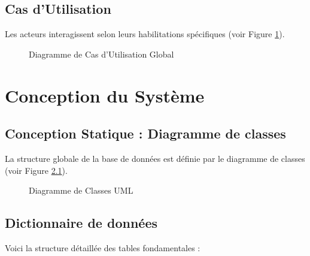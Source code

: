 \documentclass[12pt,a4paper,oneside]{report}
\begin{document}
\section{Cas d'Utilisation}
Les acteurs interagissent selon leurs habilitations spécifiques (voir Figure \ref{fig:usecase}).

\begin{figure}[H]
    \centering
    \color{gray}
    \caption{Diagramme de Cas d'Utilisation Global}
    \label{fig:usecase}
\end{figure}

\chapter{Conception du Système}

\section{Conception Statique : Diagramme de classes}
La structure globale de la base de données est définie par le diagramme de classes (voir Figure \ref{fig:classes}).

\begin{figure}[H]
    \centering
    \color{gray}
    \caption{Diagramme de Classes UML}
    \label{fig:classes}
\end{figure}

\section{Dictionnaire de données}
Voici la structure détaillée des tables fondamentales :
\end{document}
